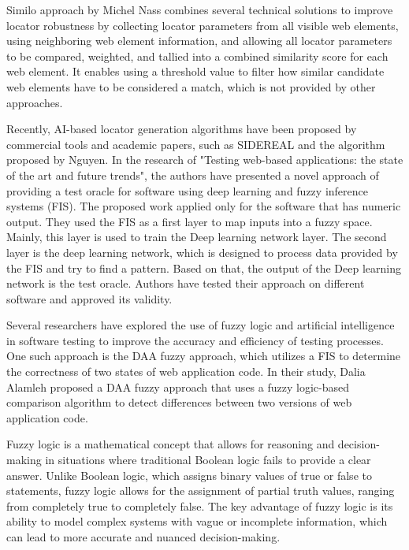 \documentclass{article}
\begin{document}
Similo approach by Michel Nass\cite{similo} combines several technical solutions to improve locator robustness by collecting locator parameters from all visible web elements, using neighboring web element information, and allowing all locator parameters to be compared, weighted, and tallied into a combined similarity score for each web element. It enables using a threshold value to filter how similar candidate web elements have to be considered a match, which is not provided by other approaches.

Recently, AI-based locator generation algorithms have been proposed by commercial tools and academic papers\cite{ai_in_testing}, such as SIDEREAL\cite{sidereal} and the algorithm proposed by Nguyen\cite{nguyen}.
In the research of "Testing web-based applications: the state of the art and future trends"\cite{state_of_art}, the authors have presented a novel approach of providing a test oracle for software using deep learning and fuzzy inference systems (FIS). The proposed work applied only for the software that has numeric output. They used the FIS as a first layer to map inputs into a fuzzy space. Mainly, this layer is used to train the Deep learning network layer. The second layer is the deep learning network, which is designed to process data provided by the FIS and try to find a pattern. Based on that, the output of the Deep learning network is the test oracle. Authors have tested their approach on different software and approved its validity.

Several researchers have explored the use of fuzzy logic and artificial intelligence in software testing to improve the accuracy and efficiency of testing processes. One such approach is the DAA fuzzy approach, which utilizes a FIS to determine the correctness of two states of web application code. In their study, Dalia Alamleh proposed a DAA fuzzy approach that uses a fuzzy logic-based comparison algorithm to detect differences between two versions of web application code. 

Fuzzy logic is a mathematical concept that allows for reasoning and decision-making in situations where traditional Boolean logic fails to provide a clear answer. Unlike Boolean logic, which assigns binary values of true or false to statements, fuzzy logic allows for the assignment of partial truth values, ranging from completely true to completely false. The key advantage of fuzzy logic is its ability to model complex systems with vague or incomplete information, which can lead to more accurate and nuanced decision-making.
\end{document}
